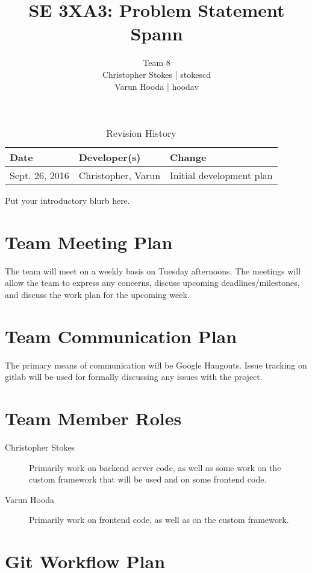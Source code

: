 \documentclass{article}
\title{SE 3XA3: Problem Statement\\Spann}
\author{Team 8
		\\ Christopher Stokes | stokescd
		\\ Varun Hooda | hoodav
}
\date{}
\begin{document}
\begin{table}[hp]
\caption{Revision History} \label{TblRevisionHistory}
\begin{tabularx}{\textwidth}{llX}
\toprule
\textbf{Date} & \textbf{Developer(s)} & \textbf{Change}\\
\midrule
    Sept. 26, 2016 & Christopher, Varun & Initial development plan\\
\bottomrule
\end{tabularx}
\end{table}

\newpage

\maketitle

Put your introductory blurb here.

\section{Team Meeting Plan}
The team will meet on a weekly basis on Tuesday afternoons. The meetings will
allow the team to express any concerns, discuss upcoming deadlines/milestones,
and discuss the work plan for the upcoming week.

\section{Team Communication Plan}
The primary means of communication will be Google Hangouts. Issue tracking on
gitlab will be used for formally discussing any issues with the project.

\section{Team Member Roles}
\begin{description}
  \item[Christopher Stokes] Primarily work on backend server code, as well as
    some work on the custom framework that will be used and on some frontend
    code.
  \item[Varun Hooda] Primarily work on frontend code, as well as on the custom
    framework.
\end{description}

\section{Git Workflow Plan}
\end{document}
